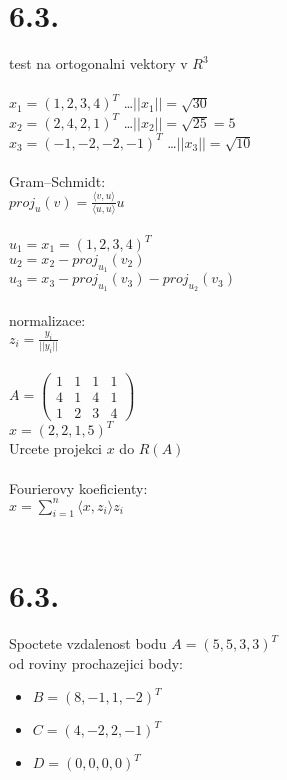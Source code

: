 \documentclass[a4paper]{article}
\begin{document}
\section*{6.3.}
test na ortogonalni vektory v $R^3$\\
\\
$x_1 = (1,2,3,4)^T$ \dots $||x_1|| = \sqrt{30}$\\
$x_2 = (2,4,2,1)^T$ \dots $||x_2|| = \sqrt{25} = 5$\\
$x_3 = (-1,-2,-2,-1)^T$ \dots $||x_3|| = \sqrt{10}$\\
\\
Gram–Schmidt:\\
$proj_u(v) = \frac{\langle v,u \rangle}{\langle u,u \rangle} u$\\
\\
$u_1 = x_1 = (1,2,3,4)^T$\\
$u_2 = x_2 - proj_{u_1}(v_2)$\\
$u_3 = x_3 - proj_{u_1}(v_3) - proj_{u_2}(v_3)$\\
\\
normalizace:\\
$z_i=\frac{y_i}{||y_i||}$\\
\\
$A = \left(
	\begin{matrix} 
		1 & 1 & 1 & 1 \\
		4 & 1 & 4 & 1 \\
		1 & 2 & 3 & 4  \end{matrix}
	\right) $\\
$x=(2,2,1,5)^T$\\
Urcete projekci $x$ do $R(A)$\\
\\
Fourierovy koeficienty:\\
$x = \sum^{n}_{i=1}{\langle x, z_i \rangle }z_i$\\
\\

\section*{6.3.}
Spoctete vzdalenost bodu $A=(5,5,3,3)^T$\\
od roviny prochazejici body:\\
\begin{itemize}
	\item $B = (8,-1,1,-2)^T$
	\item $C = (4,-2,2,-1)^T$
	\item $D = (0,0,0,0)^T$
\end{itemize}
\end{document}
